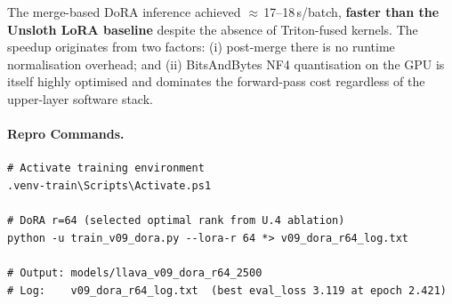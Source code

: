 \documentclass[onecolumn]{article}
\begin{document}
The merge-based DoRA inference achieved $\approx$\,17--18\,s/batch,
\textbf{faster than the Unsloth LoRA baseline} despite the absence of
Triton-fused kernels.
The speedup originates from two factors:
(i) post-merge there is no runtime normalisation overhead; and
(ii) BitsAndBytes NF4 quantisation on the GPU is itself highly
optimised and dominates the forward-pass cost regardless of the
upper-layer software stack.

\paragraph{Repro Commands.}

\begin{verbatim}
# Activate training environment
.venv-train\Scripts\Activate.ps1

# DoRA r=64 (selected optimal rank from U.4 ablation)
python -u train_v09_dora.py --lora-r 64 *> v09_dora_r64_log.txt

# Output: models/llava_v09_dora_r64_2500
# Log:    v09_dora_r64_log.txt  (best eval_loss 3.119 at epoch 2.421)
\end{verbatim}

\clearpage


\end{document}
